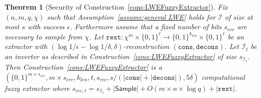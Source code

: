 \documentclass[11pt]{article}
\newcommand{\class}[1]{{\ensuremath{\mathsf{#1}}}}
\newcommand{\sample}{\ensuremath{\class{Sample}}\xspace}
\newcommand{\rext}{\ensuremath{\mathtt{rext}}}
\newcommand{\cons}{\ensuremath{\mathtt{cons}}}
\newcommand{\decons}{\ensuremath{\mathtt{decons}}}
\newtheorem{theorem}{Theorem}[section]
\begin{document}
{\begin{theorem}[Security of Construction~\ref{cons:LWEFuzzyExtractor}]\label{thm:LWEFuzzyExtractor}
Fix $(n, m, q, \chi)$ such that Assumption~\ref{assume:general LWE} holds for $\mathcal{I}$ of size at most $s$ with success $\epsilon$.  Furthermore assume that a fixed number of bits $s_{err}$ are necessary to sample from $\chi$.  Let $\rext: \chi^m \times\{0,1\}^\ell\rightarrow \{0,1\}^{k_{len}}\times \{0,1\}^\ell$ be an extractor with $(\log 1/\epsilon - \log 1/\delta, \delta)$-reconstruction $(\cons,\decons)$.  Let $\mathcal{I}_t$ be an inverter as described in Construction~\ref{cons:LWEFuzzyExtractor} of size $s_{\mathcal{I}_t}$.  Then Construction~\ref{cons:LWEFuzzyExtractor} is a $(\{0,1\}^{m\times s_{err}}, m\times s_{err}, k_{len}, t, s_{rec}, s/(|\cons|+|\decons|), 5\delta)$ computational fuzzy extractor where $s_{rec, t} = s_{\mathcal{I}_t}+ |\sample| + O(m\times n\times \log q) + |\rext|$.
\end{theorem}
}
\end{document}

